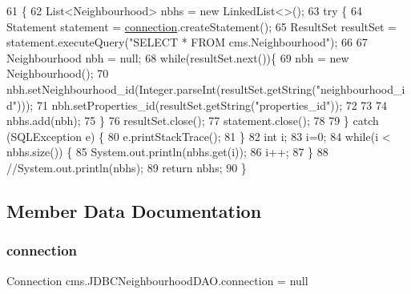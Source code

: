 \begin{DoxyCode}
61                                         \{
62         List<Neighbourhood> nbhs = \textcolor{keyword}{new} LinkedList<>();
63          \textcolor{keywordflow}{try} \{
64                 Statement statement = \mbox{\hyperlink{classcms_1_1_j_d_b_c_neighbourhood_d_a_o_a21abebcd3f93f10746a2c96c70d6dafc}{connection}}.createStatement();
65                 ResultSet resultSet = statement.executeQuery(\textcolor{stringliteral}{"SELECT * FROM cms.Neighbourhood"});
66                  
67                 Neighbourhood nbh = null;
68                 \textcolor{keywordflow}{while}(resultSet.next())\{
69                     nbh = \textcolor{keyword}{new} Neighbourhood();
70                     nbh.setNeighbourhood\_id(Integer.parseInt(resultSet.getString(\textcolor{stringliteral}{"neighbourhood\_id"})));
71                     nbh.setProperties\_id(resultSet.getString(\textcolor{stringliteral}{"properties\_id"}));
72                     
73                      
74                     nbhs.add(nbh);
75                 \}
76                 resultSet.close();
77                 statement.close();
78                  
79             \} \textcolor{keywordflow}{catch} (SQLException e) \{
80                 e.printStackTrace();
81             \}
82             \textcolor{keywordtype}{int} i;
83             i=0;
84             \textcolor{keywordflow}{while}(i < nbhs.size()) \{
85                     System.out.println(nbhs.get(i));
86                     i++;
87              \}
88             \textcolor{comment}{//System.out.println(nbhs);}
89             \textcolor{keywordflow}{return} nbhs;
90     \}
\end{DoxyCode}


\subsection{Member Data Documentation}
\mbox{\label{classcms_1_1_j_d_b_c_neighbourhood_d_a_o_a21abebcd3f93f10746a2c96c70d6dafc}} 
\subsubsection{\texorpdfstring{connection}{connection}}
{\footnotesize\ttfamily Connection cms.\+J\+D\+B\+C\+Neighbourhood\+D\+A\+O.\+connection = null\hspace{0.3cm}{\ttfamily [package]}}

